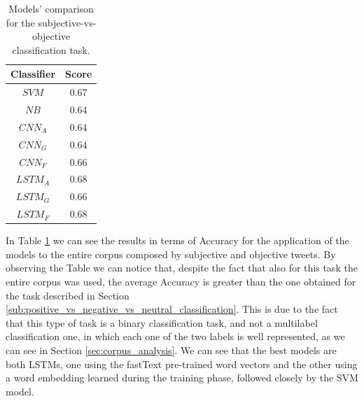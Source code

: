 \documentclass[11pt,twocolumn]{article}
\begin{document}
            \begin{table}[h]
                \centering
                \begin{tabular}{| c | c |}
                    \hline
                    \textbf{Classifier} & \textbf{Score} \\
                    \hline
                    $SVM$ & $0.67$ \\
                    \hline
                    $NB$ & $0.64$ \\
                    \hline
                    $CNN_A$ & $0.64$ \\
                    \hline
                    $CNN_G$ & $0.64$ \\
                    \hline
                    $CNN_F$ & $0.66$ \\
                    \hline
                    $LSTM_A$ & $0.68$ \\
                    \hline
                    $LSTM_G$ & $0.66$ \\
                    \hline
                    $LSTM_F$ & $0.68$ \\
                    \hline
                \end{tabular}
                \caption{Models' comparison for the subjective-vs-objective classification task.}
                \label{tab:so_comparison}
            \end{table}

            \noindent
            In Table \ref{tab:so_comparison} we can see the results in terms of Accuracy for the application
            of the models to the entire corpus composed by subjective and objective tweets. By observing the
            Table we can notice that, despite the fact that also for this task the entire corpus was used,
            the average Accuracy is greater than the one obtained for the task described in Section
            \ref{sub:positive_vs_negative_vs_neutral_classification}. This is due to the fact that this
            type of task is a binary classification task, and not a multilabel classification one, in which
            each one of the two labels is well represented, as we can see in Section
            \ref{sec:corpus_analysis}. We can see that the best models are both LSTMs, one using the
            fastText pre-trained word vectors and the other using a word embedding learned during the
            training phase, followed closely by the SVM model.
\end{document}
